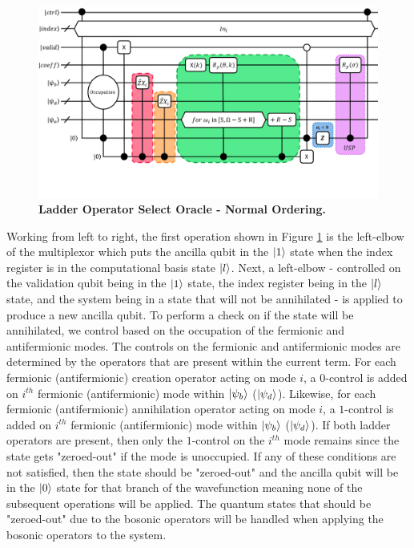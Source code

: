 \begin{figure}
    \centering
    \includegraphics[width=16cm]{figures/select-normal-ordering.pdf}
    \caption{\textbf{Ladder Operator Select Oracle - Normal Ordering.}
    }
    \label{fig:select-normal-ordering}
\end{figure}

Working from left to right, the first operation shown in Figure \ref{fig:select-normal-ordering} is the left-elbow of the multiplexor which puts the ancilla qubit in the $\ket{1}$ state when the index register is in the computational basis state $\ket{l}$.
Next, a left-elbow - controlled on the validation qubit being in the $\ket{1}$ state, the index register being in the $\ket{l}$ state, and the system being in a state that will not be annihilated - is applied to produce a new ancilla qubit.
To perform a check on if the state will be annihilated, we control based on the occupation of the fermionic and antifermionic modes.
The controls on the fermionic and antifermionic modes are determined by the operators that are present within the current term.
For each fermionic (antifermionic) creation operator acting on mode $i$, a $0$-control is added on $i^{th}$ fermionic (antifermionic) mode within $\ket{\psi_b}$ ($\ket{\psi_d}$).
Likewise, for each fermionic (antifermionic) annihilation operator acting on mode $i$, a $1$-control is added on $i^{th}$ fermionic (antifermionic) mode within $\ket{\psi_b}$ ($\ket{\psi_d}$).
If both ladder operators are present, then only the $1$-control on the $i^{th}$ mode remains since the state gets "zeroed-out" if the mode is unoccupied.
If any of these conditions are not satisfied, then the state should be "zeroed-out" and the ancilla qubit will be in the $\ket{0}$ state for that branch of the wavefunction meaning none of the subsequent operations will be applied.
The quantum states that should be "zeroed-out" due to the bosonic operators will be handled when applying the bosonic operators to the system.

